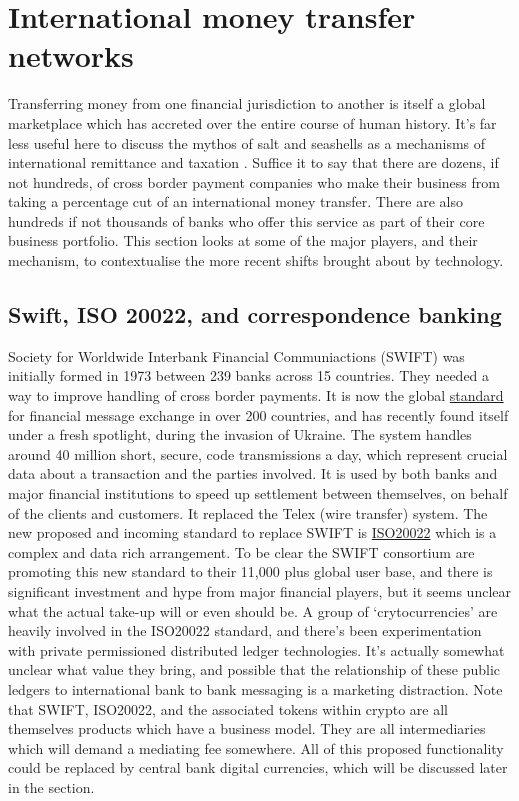 \section{International money transfer networks}
Transferring money from one financial jurisdiction to another is itself a global marketplace which has accreted over the entire course of human history. It's far less useful here to discuss the mythos of salt and seashells as a mechanisms of international remittance and taxation \cite{gainsford2017salt, goldberg2005famous}. Suffice it to say that there are dozens, if not hundreds, of cross border payment companies who make their business from taking a percentage cut of an international money transfer. There are also hundreds if not thousands of banks who offer this service as part of their core business portfolio. This section looks at some of the major players, and their mechanism, to contextualise the more recent shifts brought about by technology.
\subsection{Swift, ISO 20022, and correspondence banking}
Society for Worldwide Interbank Financial Communiactions (SWIFT) was initially formed in 1973 between 239 banks across 15 countries. They needed a way to improve handling of cross border payments. It is now the global \href{https://www.swift.com/standards}{standard} for financial message exchange in over 200 countries, and has recently found itself under a fresh spotlight, during the invasion of Ukraine. The system handles around 40 million short, secure, code transmissions a day, which represent crucial data about a transaction and the parties involved. It is used by both banks and major financial institutions to speed up settlement between themselves, on behalf of the clients and customers. It replaced the Telex (wire transfer) system. The new proposed and incoming standard to replace SWIFT is \href{https://www.swift.com/standards/iso-20022}{ISO20022} which is a complex and data rich arrangement. To be clear the SWIFT consortium are promoting this new standard to their 11,000 plus global user base, and there is significant investment and hype from major financial players, but it seems unclear what the actual take-up will or even should be. A group of `crytocurrencies' are heavily involved in the ISO20022 standard, and there's been experimentation with private permissioned distributed ledger technologies. It's actually somewhat unclear what value they bring, and possible that the relationship of these public ledgers to international bank to bank messaging is a marketing distraction. Note that SWIFT, ISO20022, and the associated tokens within crypto are all themselves products which have a business model. They are all intermediaries which will demand a mediating fee somewhere. All of this proposed functionality could be replaced by central bank digital currencies, which will be discussed later in the section.
